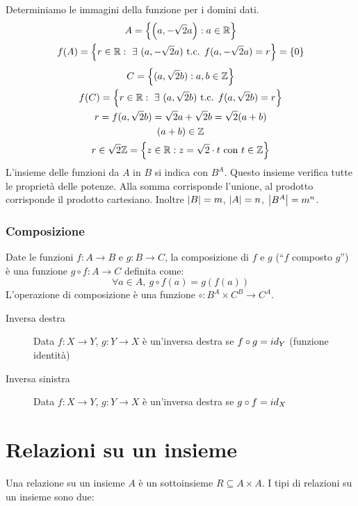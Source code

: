 Determiniamo le immagini della funzione per i domini dati.
\begin{gather*}
A = \left\{ \left( a, - \sqrt{2}a\right) : a \in \reals  \right\} \\
f(A) = \left\{ r \in \reals : \exists (a, - \sqrt{2}a) \text{ t.c. } f(a, - \sqrt{2} a) = r \right\} = \left\{ 0 \right\}
\end{gather*}
\begin{gather*}
C = \left\{ (a, \sqrt{2} b) : a, b \in \integers \right\} \\
f(C) = \left\{ r \in \reals : \exists (a, \sqrt{2} b) \text{ t.c. } f(a, \sqrt{2}b) = r \right\} \\
r = f(a, \sqrt{2} b) = \sqrt{2} a + \sqrt{2} b = \sqrt{2} (a + b) \\
(a+b) \in \integers \\
r \in \sqrt{2} \integers = \left\{z \in \reals : z = \sqrt{2} \cdot t \text{ con } t \in \integers \right\}
\end{gather*}
L'insieme delle funzioni da $A$ in $B$ si indica con $B^A$. Questo insieme verifica tutte le propriet\`a delle potenze. Alla somma corrisponde l'unione, al prodotto corrisponde il prodotto cartesiano. Inoltre $\left\lvert{B}\right\rvert = m$, $\left\lvert{A}\right\rvert = n$, $\left\lvert{B^A}\right\rvert = m^n$.

\subsubsection{Composizione}
Date le funzioni $f : A \to B$ e $g : B \to C$, la composizione di $f$ e $g$ (``$f$ composto $g$'') \`e una funzione $g \circ f : A \to C$ definita come:
\[
\forall a \in A , \ {g \circ f}(a) = g(f(a))
\]
L'operazione di composizione \`e una funzione $\circ : B^A \times C^B \to C^A$.

\begin{description}
  \item[Inversa destra] Data $f : X \to Y$, $g : Y \to X$ \`e un'inversa destra se $f \circ g = id_Y$ (funzione identit\`a)
  \item[Inversa sinistra] Data $f : X \to Y$, $g : Y \to X$ \`e un'inversa destra se $g \circ f = id_X$
\end{description}

\section{Relazioni su un insieme}

Una relazione su un insieme $A$ \`e un sottoinsieme $R \subseteq A \times A$. I tipi di relazioni su un insieme sono due:

